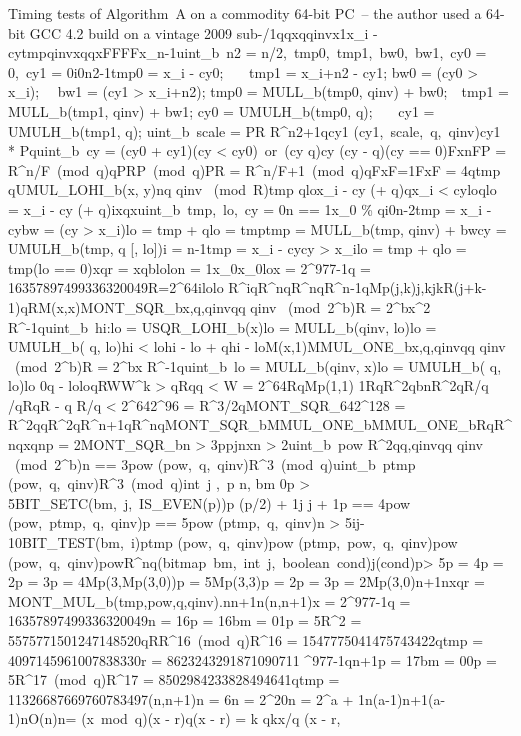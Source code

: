 \documentclass{article}
\newcommand \ra {\rightarrow}
\begin{document}
Timing tests of Algorithm~A on a commodity 64-bit PC~-- the author used a 64-bit GCC 4.2 build on a vintage 2009 sub-\xqn/1qqxqqinvx1x_i - cytmpqinvxqqxFFFFx_{n-1}uint_b\ n2 = n/2,\ tmp0,\ tmp1,\ bw0,\ bw1,\ cy0 = 0,\ cy1 = 0i\leftarrow 0n2-1tmp0 = x_i - cy0;						\qquad\qquad\qquad\qquad\ \ \ 	tmp1 = x_{i+n2} - cy1;	bw0 = (cy0 > x_i);						\qquad\qquad\qquad\qquad\ \ 	bw1 = (cy1 > x_{i+n2});	tmp0 = {\rm MULL_b}(tmp0, qinv) + bw0;\ \ tmp1 = {\rm MULL_b}(tmp1, qinv) + bw1;	cy0 = {\rm UMULH_b}(tmp0, q);			\qquad\qquad\ \ \ 	cy1 = {\rm UMULH_b}(tmp1, q);	uint_b\ scale = P\cdot R \equiv R^{n2+1}qcy1 (cy1,\ scale,\ q,\ qinv)cy1 * Pquint_b\ cy = (cy0 + cy1)(cy < cy0)\ or\ (cy \ge q)cy \leftarrow (cy - q)(cy == 0)FxnFP = R^{n/F}\ ({\rm mod}\ q)qPRP\ ({\rm mod}\ q)P\cdot R = R^{n/F+1}\ ({\rm mod}\ q)qFxF=1FxF = 4qtmp \cdot q{\rm UMUL\_LOHI_b}(x, y)nq \cdot qinv \ ({\rm mod}\ R)tmp \cdot qlox_i - cy (+ q)qx_i < cyloqlo = x_i - cy (+ q)ixqxuint_b\ tmp,\ lo,\ cy = 0n == 1x_0 \% qi\leftarrow 0n-2tmp  = x_i - cybw = (cy > x_i)lo = tmp + qlo = tmptmp = {\rm MULL_b}(tmp, qinv) + bwcy = {\rm UMULH_b}(tmp, q [, lo])i = n-1tmp  = x_i - cycy > x_ilo = tmp + qlo = tmp(lo == 0)xqr = xqblolon = 1x_0x_0lox = 2^{977}-1q = 16357897499336320049R=2^{64}ilolo \cdot R^{i}qR^nqR^nqR^{n-1}qMp(j,k)j,kjkR(j+k-1)qRM(x,x){\rm MONT\_SQR_b}x,q,qinvqq \cdot qinv \ ({\rm mod}\ 2^b)R = 2^bx^2 \cdot R^{-1}quint_b\ hi:lo = {\rm USQR\_LOHI_b}(x)lo = {\rm MULL_b}(qinv, lo)lo = {\rm UMULH_b}(   q, lo)hi < lohi - lo + qhi - loM(x,1){\rm MMUL\_ONE_b}x,q,qinvqq \cdot qinv \ ({\rm mod}\ 2^b)R = 2^bx \cdot R^{-1}quint_b\ lo = {\rm MULL_b}(qinv, x)lo = {\rm UMULH_b}(   q, lo)lo \ne 0q - loloqRWW^k > qRqq < W = 2^{64}RqMp(1,1) \ra 1RqR^2qbnR^2q\lfloor R/q \rfloorR/qRqR - q \cdot \lfloor R/q \rfloorq < 2^{64}2^{96} = R^{3/2}q{\rm MONT\_SQR}_{64}2^{128} = R^2qqR^2qR^{n+1}qR^nq{\rm MONT\_SQR_b}{\rm MMUL\_ONE_b}{\rm MMUL\_ONE_b}RqR^nqxqnp = 2{\rm MONT\_SQR_b}n > 3ppjnxn > 2uint_b\ pow \equiv R^2qq,qinvqq \cdot qinv \ ({\rm mod}\ 2^b){\rm n} == 3pow \leftarrow {\rm MONT\_SQR_b}(pow,\ q,\ qinv)R^3\ ({\rm mod}\ q)uint_b\ ptmp (pow,\ q,\ qinv)R^3\ ({\rm mod}\ q)int\ j \leftarrow 0,\ p \leftarrow n, bm p > 5{\rm BIT\_SETC}(bm,\ j,\ {\rm IS\_EVEN}(p))p \leftarrow (p/2) + 1j \leftarrow j + 1{\rm p} == 4pow (pow,\ ptmp,\ q,\ qinv){\rm p} == 5pow (ptmp,\ q,\ qinv)n > 5i\leftarrow j-10{\rm BIT\_TEST}(bm,\ i)ptmp (pow,\ q,\ qinv)pow  (ptmp,\ pow,\ q,\ qinv)pow  (pow,\ q,\ qinv)powR^nq(bitmap\ bm,\ int\ j,\ boolean\ cond)j(cond)p> 5p = 4p = 2p = 3p = 4Mp(3,Mp(3,0))p = 5Mp(3,3)p = 2p = 3p = 2Mp(3,0)n+1nxqr = {\rm MONT\_MUL_b}(tmp,pow,q,qinv).nn+1n(n,n+1)x = 2^{977}-1q = 16357897499336320049n = 16p = 16bm = 01p = 5R^2 = 5575771501247148520qRR^{16}\ ({\rm mod}\ q)R^{16} = 1547775041475743422qtmp = 4097145961007838330r = 8623243291871090711 ^{977}-1qn+1p = 17bm = 00p = 5R^{17}\ ({\rm mod}\ q)R^{17} = 8502984233828494641qtmp = 11326687669760783497(n,n+1)n = 6n = 2^{20}n = 2^a + 1n(a-1)n+1(a-1)nO(\lg n)n\ra\ooxqinvxr = (x\ {\rm mod}\ q)(x - r)q(x - r) = k \cdot qk\lfloor x/q (x - r, 
\end{document}
